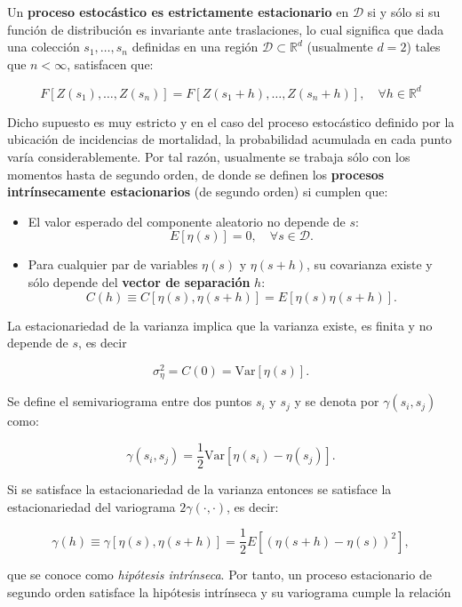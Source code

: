 \documentclass[11pt, oneside]{book}
\begin{document}
Un \textbf{proceso estocástico es estrictamente estacionario} en $\mathcal{D}$ si y sólo si su función de distribución es invariante ante traslaciones, lo cual significa que dada una colección $s_1,\ldots,s_n$ definidas en una región $\mathcal{D}\subset\mathbb{R}^d$ (usualmente $d=2$) tales que $n<\infty$, satisfacen que: 

$$F[Z(s_1),\ldots,Z(s_n)] = F[Z(s_1+h),\ldots,Z(s_n+h)], \quad \forall h \in \mathbb{R}^d$$

\bigskip 

Dicho supuesto es muy estricto y en el caso del proceso estocástico definido por la ubicación de incidencias de mortalidad, la probabilidad acumulada en cada punto varía considerablemente. Por tal razón, usualmente se trabaja sólo con los momentos hasta de segundo orden, de donde se definen los \textbf{procesos intrínsecamente estacionarios} (de segundo orden) si cumplen que:

\begin{itemize}
  \item El valor esperado del componente aleatorio no depende de $s$: 
  $$E[\eta(s)] = 0, \quad \forall s\in \mathcal{D}.$$
  
  \bigskip
  
  \item Para cualquier par de variables $\eta(s)$ y $\eta(s+h)$, su covarianza existe y sólo depende del \textbf{vector de separación} $h$:
  $$C(h)\equiv C[\eta(s),\eta(s+h)] = E[\eta(s)\eta(s+h)].$$
\end{itemize}

\bigskip

La estacionariedad de la varianza implica que la varianza existe, es finita y no depende de $s$, es decir 

$$\sigma_{\eta}^2=C(0)=\textrm{Var}[\eta(s)].$$

\bigskip

Se define el semivariograma entre dos puntos $s_i$ y $s_j$ y se denota por $\gamma(s_i,s_j)$ como:

$$\gamma(s_i,s_j) = \frac{1}{2}\textrm{Var}[\eta(s_i)-\eta(s_j)].$$

\bigskip 

Si se satisface la estacionariedad de la varianza entonces se satisface la estacionariedad del variograma $2\gamma(\cdot,\cdot)$, es decir:

$$\gamma(h) \equiv \gamma[\eta(s),\eta(s+h)] = \frac{1}{2}E\left[\left(\eta(s+h)-\eta(s)\right)^2\right],$$

\noindent que se conoce como \emph{hipótesis intrínseca}. Por tanto, un proceso estacionario de segundo orden satisface la hipótesis intrínseca y su variograma cumple la relación
\end{document}
